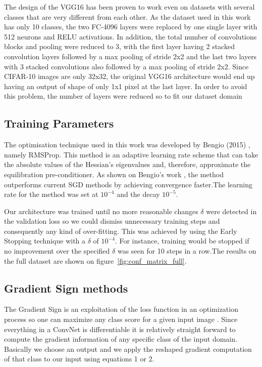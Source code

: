 \documentclass[runningheads,a4paper]{llncs}
\begin{document}
The design of the VGG16 has been proven to work even on datasets with several classes that are very different from each other. As the dataset used in this work has only 10 classes, the two FC-4096 layers were replaced by one single layer with 512 neurons and RELU activations. In addition, the total number of convolutions blocks and pooling were reduced to 3, with the first layer having 2 stacked convolution layers followed by a max pooling of stride 2x2 and the last two layers with 3 stacked convolutions also followed by a max pooling of stride 2x2. Since CIFAR-10 images are only 32x32, the original VGG16 architecture would end up having an output of shape of only 1x1 pixel at the last layer. In order to avoid this problem, the number of layers were reduced so to fit our dataset domain
\subsection{Training Parameters}
The optimisation technique used in this work was developed by Bengio (2015) \cite{bengiormsprop}, namely RMSProp. This method is an adaptive learning rate scheme that can take the absolute values of the Hessian's eigenvalues and, therefore, approximate the equilibration pre-conditioner. As shown on Bengio's work \cite{bengiormsprop}, the method outperforms current SGD methods by achieving convergence faster.The learning rate for the method was set at $10^{-4}$ and the decay $10^{-5}$.

Our architecture was trained until no more reasonable changes  $\delta$ were detected in the validation loss so we could dismiss unnecessary training steps and consequently any kind of over-fitting. This was achieved by using the Early Stopping technique with a $\delta$ of $10^{-4}$. For instance, training would be stopped if no improvement over the specified $\delta$ was seen for 10 steps in a row.The results on the full dataset are shown on figure~\ref{fig:conf_matrix_full}.

\subsection{Gradient Sign methods}

The Gradient Sign is an exploitation of the loss function in an optimization process so one can maximize any class score for a given input image \cite{papernot2016}. Since everything in a ConvNet is differentiable it is relatively straight forward to compute the gradient information of any specific class of the input domain. Basically we choose an  output and we apply the reshaped gradient computation of that class to our input using equations 1 or 2.
\end{document}
